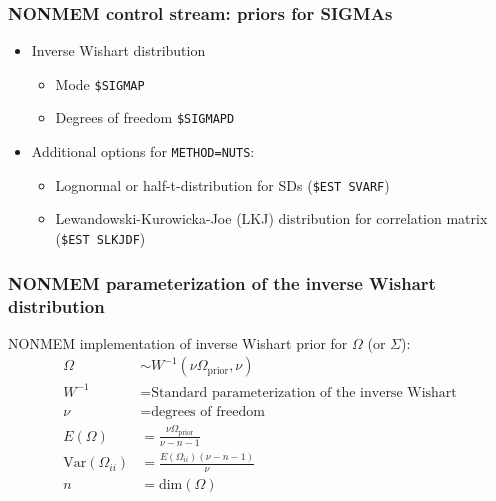 \documentclass[handout]{beamer}
\begin{document}
\begin{frame}[fragile]
  \frametitle{NONMEM control stream: priors for SIGMAs}

\begin{itemize}
  \item Inverse Wishart distribution
  \begin{itemize}
    \item Mode \verb|$SIGMAP|
    \item Degrees of freedom \verb|$SIGMAPD|
  \end{itemize}
  \item Additional options for \verb|METHOD=NUTS|:
        \begin{itemize}
          \item Lognormal or half-t-distribution for SDs (\verb|$EST SVARF|)
          \item Lewandowski-Kurowicka-Joe (LKJ) distribution for correlation matrix (\verb|$EST SLKJDF|)
        \end{itemize}
\end{itemize}

\end{frame}

\begin{frame}
  \frametitle{NONMEM parameterization of the inverse Wishart distribution}
  
NONMEM implementation of inverse Wishart prior for $\Omega$ (or
    $\Sigma$):
    \begin{align*}
      \Omega &\sim W^{-1}\left(\nu\Omega_\text{prior}, \nu\right) \\
W^{-1} &= \text{Standard parameterization of the inverse Wishart} \\
\nu &= \text{degrees of freedom} \\
E\left(\Omega\right) &= \frac{\nu\Omega_\text{prior}}{\nu - n - 1} \\
\text{Var}\left(\Omega_{ii}\right) &= \frac{E\left(\Omega_{ii}\right)  \left(\nu - n -
                          1\right)}{\nu} \\
n &= \text{dim}\left(\Omega\right)
    \end{align*}

\end{frame}
\end{document}
